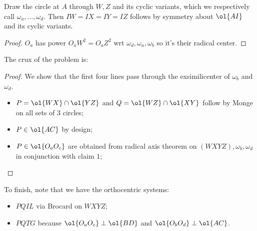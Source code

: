 \documentclass{seto}
\begin{document}
Draw the circle at $A$ through $W,Z$ and its cyclic variants, which we respectively call $\omega_a,\dots,\omega_d$. 
Then $IW=IX=IY=IZ$ follows by symmetry about $\ol{AI}$ and its cyclic variants.\\
\begin{proof} $O_a$ has power $O_aW^2=O_aZ^2$ wrt $\omega_d,\omega_a,\omega_b$ so it's their radical center.
\end{proof}
The crux of the problem is:
\begin{proof} We show that the first four lines pass through the exsimilicenter of $\omega_b$ and $\omega_d$.
\begin{itemize}
\item $P=\ol{WX}\cap\ol{YZ}$ and $Q=\ol{WZ}\cap\ol{XY}$ follow by Monge on all sets of $3$ circles;
\item $P\in\ol{AC}$ by design;
\item $P\in\ol{O_aO_c}$ are obtained from radical axis theorem on $(WXYZ),\omega_b,\omega_d$ in conjunction with claim $1$;
\end{itemize}
\end{proof}
To finish, note that we have the orthocentric systems:
\begin{itemize}
\item $PQIL$ via Brocard on $WXYZ$;
\item $PQTG$ because $\ol{O_aO_c}\perp\ol{BD}$ and $\ol{O_bO_d}\perp\ol{AC}$.
\end{itemize}
\end{document}

